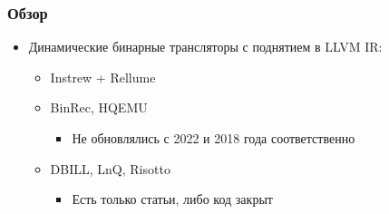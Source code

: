 \documentclass{beamer}
\begin{document}
\begin{frame}
	\frametitle{Обзор}
	\begin{itemize}
		\item Динамические бинарные трансляторы с поднятием в LLVM IR:
		      \begin{itemize}
			      \item Instrew + Rellume
			      \item BinRec, HQEMU
			            \begin{itemize}
				            \item Не обновлялись с 2022 и 2018 года соответственно
			            \end{itemize}
			      \item DBILL, LnQ, Risotto
			            \begin{itemize}
				            \item Есть только статьи, либо код закрыт
			            \end{itemize}
		      \end{itemize}
	\end{itemize}
\end{frame}
\end{document}
